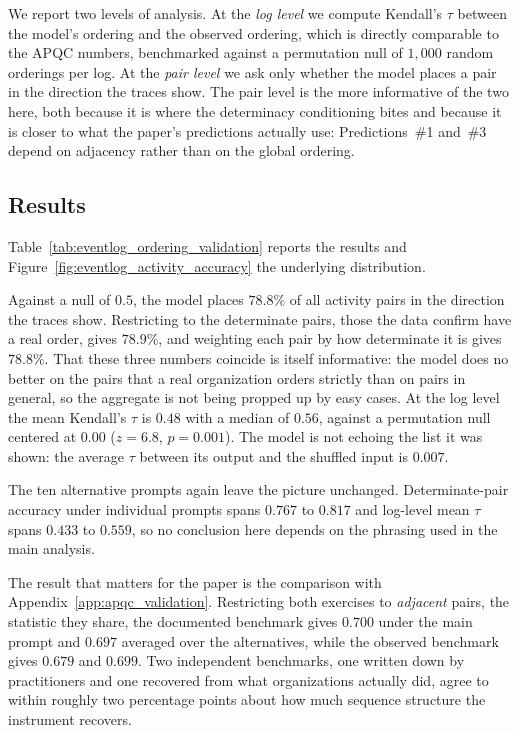 We report two levels of analysis.
At the \emph{log level} we compute Kendall's $\tau$ between the model's ordering and the observed ordering,
which is directly comparable to the APQC numbers, benchmarked against a permutation null of $1{,}000$ random
orderings per log.
At the \emph{pair level} we ask only whether the model places a pair in the direction the traces show.
The pair level is the more informative of the two here, both because it is where the determinacy
conditioning bites and because it is closer to what the paper's predictions actually use: Predictions~\#1
and~\#3 depend on adjacency rather than on the global ordering.

\subsection{Results}
\label{app:eventlog_results}

Table~\ref{tab:eventlog_ordering_validation} reports the results and
Figure~\ref{fig:eventlog_activity_accuracy} the underlying distribution.

Against a null of $0.5$, the model places $78.8\%$ of all activity pairs in the direction the traces show.
Restricting to the determinate pairs, those the data confirm have a real order, gives $78.9\%$, and weighting
each pair by how determinate it is gives $78.8\%$.
That these three numbers coincide is itself informative: the model does no better on the pairs that a real
organization orders strictly than on pairs in general, so the aggregate is not being propped up by easy
cases.
At the log level the mean Kendall's $\tau$ is $0.48$ with a median of $0.56$, against a permutation null
centered at $0.00$ ($z = 6.8$, $p = 0.001$).
The model is not echoing the list it was shown: the average $\tau$ between its output and the shuffled input
is $0.007$.

The ten alternative prompts again leave the picture unchanged.
Determinate-pair accuracy under individual prompts spans $0.767$ to $0.817$ and log-level mean $\tau$ spans
$0.433$ to $0.559$, so no conclusion here depends on the phrasing used in the main analysis.

The result that matters for the paper is the comparison with Appendix~\ref{app:apqc_validation}.
Restricting both exercises to \emph{adjacent} pairs, the statistic they share, the documented benchmark gives
$0.700$ under the main prompt and $0.697$ averaged over the alternatives, while the observed benchmark gives
$0.679$ and $0.699$.
Two independent benchmarks, one written down by practitioners and one recovered from what organizations
actually did, agree to within roughly two percentage points about how much sequence structure the instrument
recovers.


